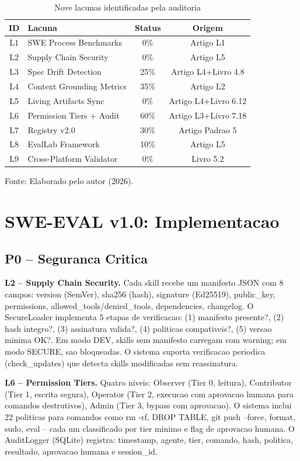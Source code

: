 \documentclass[12pt,a4paper,oneside,sumario=tradicional,chapter=TITLE,section=TITLE,subsection=TITLE,english,brazil]{abntex2}
\begin{document}
\begin{table}[H]\centering\caption{Nove lacunas identificadas pela auditoria}\label{tab:audit}
\begin{tabular}{clcc}\toprule\textbf{ID} & \textbf{Lacuna} & \textbf{Status} & \textbf{Origem} \\\midrule
L1 & SWE Process Benchmarks & 0\% & Artigo L1 \\
L2 & Supply Chain Security & 0\% & Artigo L5 \\
L3 & Spec Drift Detection & 25\% & Artigo L4+Livro 4.8 \\
L4 & Context Grounding Metrics & 35\% & Artigo L2 \\
L5 & Living Artifacts Sync & 0\% & Artigo L4+Livro 6.12 \\
L6 & Permission Tiers + Audit & 60\% & Artigo L3+Livro 7.18 \\
L7 & Registry v2.0 & 30\% & Artigo Padrao 5 \\
L8 & EvalLab Framework & 10\% & Artigo L5 \\
L9 & Cross-Platform Validator & 0\% & Livro 5.2 \\\bottomrule
\end{tabular}
\small\vspace{2pt}Fonte: Elaborado pelo autor (2026).\smallskip
\end{table}

\section{SWE-EVAL v1.0: Implementacao}

\subsection{P0 -- Seguranca Critica}

\textbf{L2 -- Supply Chain Security.} Cada skill recebe um manifesto JSON com 8 campos: version (SemVer), sha256 (hash), signature (Ed25519), public\_key, permissions, allowed\_tools/denied\_tools, dependencies, changelog. O SecureLoader implementa 5 etapas de verificacao: (1) manifesto presente?, (2) hash integro?, (3) assinatura valida?, (4) politicas compativeis?, (5) versao minima OK?. Em modo DEV, skills sem manifesto carregam com warning; em modo SECURE, sao bloqueadas. O sistema suporta verificacao periodica (check\_updates) que detecta skills modificadas sem reassinatura.

\textbf{L6 -- Permission Tiers.} Quatro niveis: Observer (Tier 0, leitura), Contributor (Tier 1, escrita segura), Operator (Tier 2, execucao com aprovacao humana para comandos destrutivos), Admin (Tier 3, bypass com aprovacao). O sistema inclui 22 politicas para comandos como rm -rf, DROP TABLE, git push --force, format, sudo, eval -- cada um classificado por tier minimo e flag de aprovacao humana. O AuditLogger (SQLite) registra: timestamp, agente, tier, comando, hash, politica, resultado, aprovacao humana e session\_id.
\end{document}
